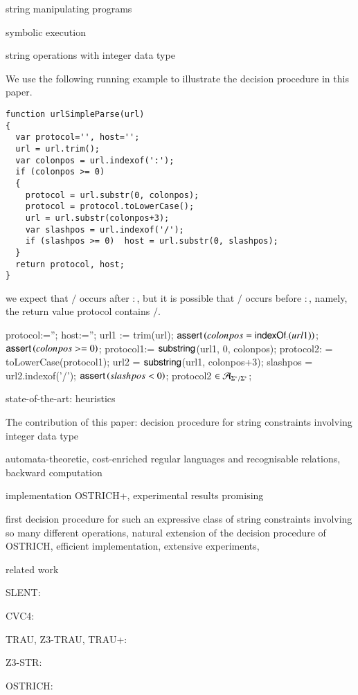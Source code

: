 
string manipulating programs

symbolic execution

string operations with integer data type

We use the following running example to illustrate the decision procedure in this paper.
{\small
\begin{verbatim}
function urlSimpleParse(url)
{
  var protocol='', host='';
  url = url.trim();
  var colonpos = url.indexof(':');
  if (colonpos >= 0) 
  {
    protocol = url.substr(0, colonpos);
    protocol = protocol.toLowerCase();
    url = url.substr(colonpos+3);
    var slashpos = url.indexof('/');
    if (slashpos >= 0)  host = url.substr(0, slashpos); 
  }
  return protocol, host; 
}
\end{verbatim}
}

we expect that $/$ occurs after $:$, but it is possible that $/$ occurs before $:$, namely, the return value protocol contains $/$.

protocol:=''; host:='';
url1 := trim(url);
$\textsf{assert}\left(colonpos = \mathsf{indexOf}_{:}(url1)\right)$;
$\textsf{assert}\left(colonpos>=0\right)$;
protocol1:= $\mathsf{substring}$(url1, 0, colonpos);
protocol2: = toLowerCase(protocol1);
url2 = $\mathsf{substring}$(url1, colonpos+3);
slashpos = url2.indexof('/');
$\textsf{assert}\left(slashpos < 0\right)$;
protocol2 $\in \mathcal{A}_{\Sigma^*/\Sigma^*}$;



state-of-the-art: heuristics

The contribution of this paper: decision procedure for string constraints involving integer data type

automata-theoretic, cost-enriched regular languages and recognisable relations, backward computation

implementation OSTRICH+, experimental results promising

first decision procedure for such an expressive class of string constraints involving so many different operations, natural extension of the decision procedure of OSTRICH, efficient implementation, extensive experiments, 


related work

SLENT: \cite{WC+18}

CVC4: \cite{cvc4}

TRAU, Z3-TRAU, TRAU+: \cite{Abdulla17,AbdullaA+19}

Z3-STR: \cite{Z3-str}

OSTRICH: \cite{CHL+19}